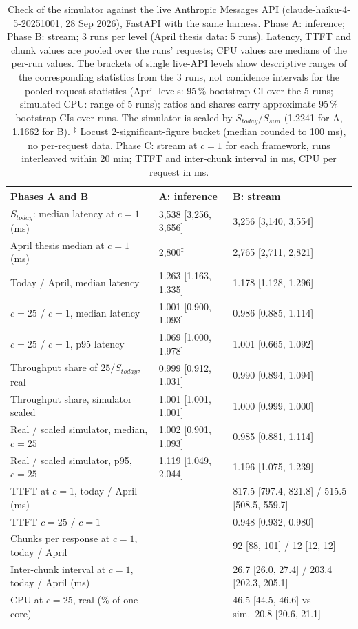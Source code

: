 \begin{table}[tbp]
  \caption{Check of the simulator against the live Anthropic Messages API (claude-haiku-4-5-20251001, 28 Sep 2026), FastAPI with the same harness.
  Phase A: inference; Phase B: stream; 3 runs per level (April thesis data: 5 runs). Latency, TTFT and chunk values are pooled over
  the runs' requests; CPU values are medians of the per-run values. The brackets of single live-API levels show descriptive ranges
  of the corresponding statistics from the 3 runs, not confidence intervals for the pooled request statistics (April levels: 95\,\% bootstrap CI over the 5 runs;
  simulated CPU: range of 5 runs); ratios and shares carry approximate 95\,\% bootstrap CIs over runs. The simulator is scaled by $S_{today}/S_{sim}$ (1.2241 for A, 1.1662
  for B). $^\ddagger$ Locust 2-significant-figure bucket (median rounded to 100 ms), no per-request data. Phase C: stream at $c=1$ for
  each framework, runs interleaved within 20 min; TTFT and inter-chunk interval in ms, CPU per request in ms.}
  \label{tab:validation}
  \footnotesize
  \begin{tabular}{@{}lll@{}}
    \toprule
    Phases A and B & A: inference & B: stream \\
    \midrule
    $S_{today}$: median latency at $c=1$ (ms) & 3,538 [3,256, 3,656] & 3,256 [3,140, 3,554] \\
    April thesis median at $c=1$ (ms) & 2,800$^\ddagger$ & 2,765 [2,711, 2,821] \\
    Today / April, median latency & 1.263 [1.163, 1.335] & 1.178 [1.128, 1.296] \\
    $c=25$ / $c=1$, median latency & 1.001 [0.900, 1.093] & 0.986 [0.885, 1.114] \\
    $c=25$ / $c=1$, p95 latency & 1.069 [1.000, 1.978] & 1.001 [0.665, 1.092] \\
    Throughput share of $25/S_{today}$, real & 0.999 [0.912, 1.031] & 0.990 [0.894, 1.094] \\
    Throughput share, simulator scaled & 1.001 [1.001, 1.001] & 1.000 [0.999, 1.000] \\
    Real / scaled simulator, median, $c=25$ & 1.002 [0.901, 1.093] & 0.985 [0.881, 1.114] \\
    Real / scaled simulator, p95, $c=25$ & 1.119 [1.049, 2.044] & 1.196 [1.075, 1.239] \\
    TTFT at $c=1$, today / April (ms) &  & 817.5 [797.4, 821.8] / 515.5 [508.5, 559.7] \\
    TTFT $c=25$ / $c=1$ &  & 0.948 [0.932, 0.980] \\
    Chunks per response at $c=1$, today / April &  & 92 [88, 101] / 12 [12, 12] \\
    Inter-chunk interval at $c=1$, today / April (ms) &  & 26.7 [26.0, 27.4] / 203.4 [202.3, 205.1] \\
    CPU at $c=25$, real (\% of one core) &  & 46.5 [44.5, 46.6] vs sim.\ 20.8 [20.6, 21.1] \\
    \bottomrule
  \end{tabular}


\end{table}
